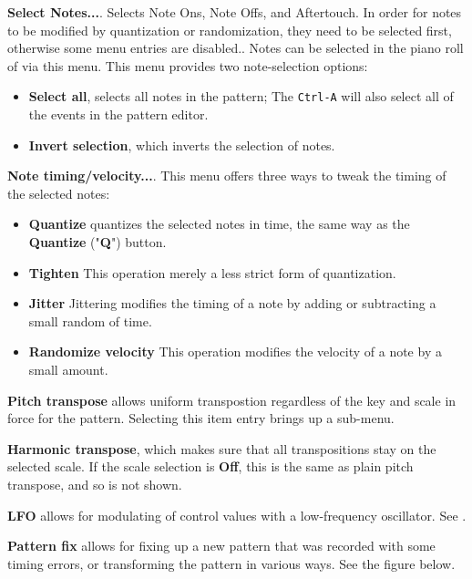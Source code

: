    \begin{enumber}
      \item \textbf{Select Notes...}.
      Selects Note Ons, Note Offs, and Aftertouch.
      In order for notes to be modified by quantization or randomization,
      they need to be selected first, otherwise some menu entries are
      disabled..
      Notes can be selected in the piano roll of via this menu.
      This menu provides two note-selection options:
         \begin{itemize}
            \item \textbf{Select all}, selects all notes in the pattern;
               The  \texttt{Ctrl-A} will also select
               all of the events in the pattern editor.
            \item \textbf{Invert selection}, which inverts the selection of
               notes.
         \end{itemize}
      \item \textbf{Note timing/velocity...}. This menu
            offers three ways to tweak the timing of the selected notes:
         \begin{itemize}
            \item \textbf{Quantize}
               quantizes the selected notes in time, the same way as the
               \textbf{Quantize} ("\textbf{Q}") button.
            \item \textbf{Tighten}
               This operation merely a less strict form of quantization.
            \item \textbf{Jitter}
               Jittering modifies the timing of a note by adding or subtracting
               a small random of time.
            \item \textbf{Randomize velocity}
               This operation modifies the velocity of a note by a small
               amount.
         \end{itemize}
      \item \textbf{Pitch transpose} allows uniform transpostion
         regardless of the key and scale in force for the pattern.
         Selecting this item entry brings up a sub-menu.
      \item \textbf{Harmonic transpose}, which makes sure
         that all transpositions stay on the selected scale.
         If the scale selection is \textbf{Off}, this is the same as plain pitch
         transpose, and so is not shown.
      \item \textbf{LFO} allows for modulating of control values with a
         low-frequency oscillator.
         See .
      \item \textbf{Pattern fix} allows for fixing up a new pattern
         that was recorded with some timing errors, or transforming the
         pattern in various ways.
         See the figure below.
   \end{enumber}

